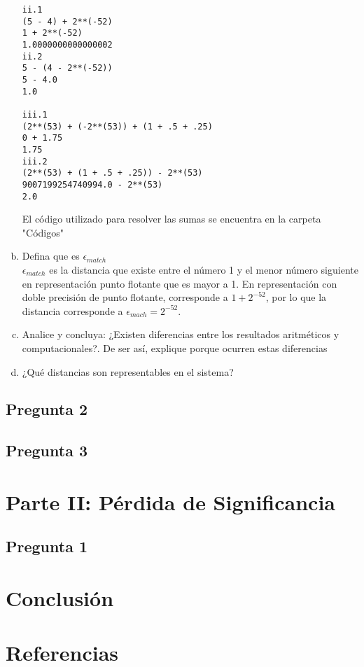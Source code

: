 \documentclass[10pt|letterpaper]{article}
\begin{document}
\begin{enumerate}[a)]
\begin{verbatim}
ii.1
(5 - 4) + 2**(-52)
1 + 2**(-52)
1.0000000000000002
ii.2
5 - (4 - 2**(-52))
5 - 4.0
1.0

iii.1
(2**(53) + (-2**(53)) + (1 + .5 + .25)
0 + 1.75
1.75
iii.2
(2**(53) + (1 + .5 + .25)) - 2**(53)
9007199254740994.0 - 2**(53)
2.0
\end{verbatim}
El código utilizado para resolver las sumas se encuentra en la carpeta "Códigos"

\item Defina que es $\epsilon_{match}$\\
$\epsilon_{match}$ es la distancia que existe entre el número 1 y el menor número siguiente en representación punto flotante que es mayor a 1.
En representación con doble precisión de punto flotante, corresponde a $1 + 2^{-52}$, por lo que la distancia corresponde  a $\epsilon_{mach} = 2^{-52}$.

\item Analice y concluya: ¿Existen diferencias entre los resultados aritméticos y computacionales?.
De ser así, explique porque ocurren estas diferencias\\

\item ¿Qué distancias son representables en el sistema?

\end{enumerate}

\subsection{Pregunta 2}

\subsection{Pregunta 3}

\section{Parte II: Pérdida de Significancia}

\subsection{Pregunta 1}

\section{Conclusión}

\section{Referencias}
\end{document}
